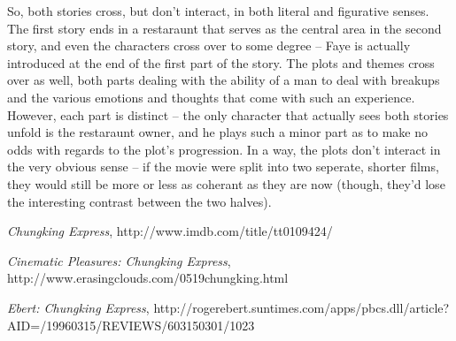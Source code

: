\documentclass{article}
\begin{document}
So, both stories cross, but don't interact, in both literal and figurative senses.
The first story ends in a restaraunt that serves as the central area in the second story, and even the characters cross over to some degree -- Faye is actually introduced at the end of the first part of the story.
The plots and themes cross over as well, both parts dealing with the ability of a man to deal with breakups and the various emotions and thoughts that come with such an experience.
However, each part is distinct -- the only character that actually sees both stories unfold is the restaraunt owner, and he plays such a minor part as to make no odds with regards to the plot's progression.
In a way, the plots don't interact in the very obvious sense -- if the movie were split into two seperate, shorter films, they would still be more or less as coherant as they are now (though, they'd lose the interesting contrast between the two halves).

\begin{thebibliography}{9}

	\emph{Chungking Express}, http://www.imdb.com/title/tt0109424/

	\emph{Cinematic Pleasures: Chungking Express}, http://www.erasingclouds.com/0519chungking.html

	\emph{Ebert: Chungking Express}, http://rogerebert.suntimes.com/apps/pbcs.dll/article?AID=/19960315/REVIEWS/603150301/1023

\end{thebibliography}
\end{document}
